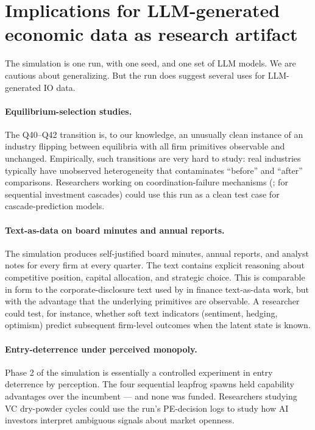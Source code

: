 \documentclass[11pt]{article}
\begin{document}
\section{Implications for LLM-generated economic data as research artifact}\label{sec:research_use}

The simulation is one run, with one seed, and one set of LLM models. We are cautious about generalizing. But the run does suggest several uses for LLM-generated IO data.

\paragraph{Equilibrium-selection studies.} The Q40--Q42 transition is, to our knowledge, an unusually clean instance of an industry flipping between equilibria with all firm primitives observable and unchanged. Empirically, such transitions are very hard to study: real industries typically have unobserved heterogeneity that contaminates ``before'' and ``after'' comparisons. Researchers working on coordination-failure mechanisms (\citealp{CooperJohn1988,Cooper1999}; \citealp{ChamleyGale1994} for sequential investment cascades) could use this run as a clean test case for cascade-prediction models.

\paragraph{Text-as-data on board minutes and annual reports.} The simulation produces self-justified board minutes, annual reports, and analyst notes for every firm at every quarter. The text contains explicit reasoning about competitive position, capital allocation, and strategic choice. This is comparable in form to the corporate-disclosure text used by \citet{LoughranMcDonald2011} in finance text-as-data work, but with the advantage that the underlying primitives are observable. A researcher could test, for instance, whether soft text indicators (sentiment, hedging, optimism) predict subsequent firm-level outcomes when the latent state is known.

\paragraph{Entry-deterrence under perceived monopoly.} Phase 2 of the simulation is essentially a controlled experiment in entry deterrence by perception. The four sequential leapfrog spawns held capability advantages over the incumbent --- and none was funded. Researchers studying VC dry-powder cycles \citep{KortumLerner2000,GompersLerner2001} could use the run's PE-decision logs to study how AI investors interpret ambiguous signals about market openness.
\end{document}
